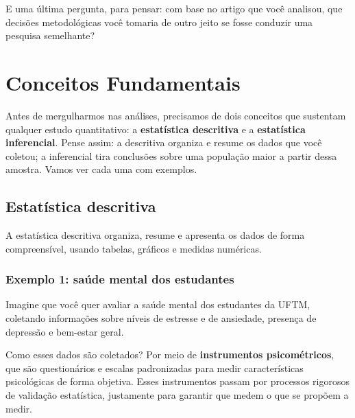 \documentclass[
]{book}
\begin{document}
E uma última pergunta, para pensar: com base no artigo que você analisou, que decisões metodológicas você tomaria de outro jeito se fosse conduzir uma pesquisa semelhante?

\chapter{Conceitos Fundamentais}\label{conceitos-fundamentais}

Antes de mergulharmos nas análises, precisamos de dois conceitos que sustentam qualquer estudo quantitativo: a \textbf{estatística descritiva} e a \textbf{estatística inferencial}. Pense assim: a descritiva organiza e resume os dados que você coletou; a inferencial tira conclusões sobre uma população maior a partir dessa amostra. Vamos ver cada uma com exemplos.

\section{Estatística descritiva}\label{estatuxedstica-descritiva}

A estatística descritiva organiza, resume e apresenta os dados de forma compreensível, usando tabelas, gráficos e medidas numéricas.

\subsection{Exemplo 1: saúde mental dos estudantes}\label{exemplo-1-sauxfade-mental-dos-estudantes}

Imagine que você quer avaliar a saúde mental dos estudantes da UFTM, coletando informações sobre níveis de estresse e de ansiedade, presença de depressão e bem-estar geral.

Como esses dados são coletados? Por meio de \textbf{instrumentos psicométricos}, que são questionários e escalas padronizadas para medir características psicológicas de forma objetiva. Esses instrumentos passam por processos rigorosos de validação estatística, justamente para garantir que medem o que se propõem a medir.
\end{document}
